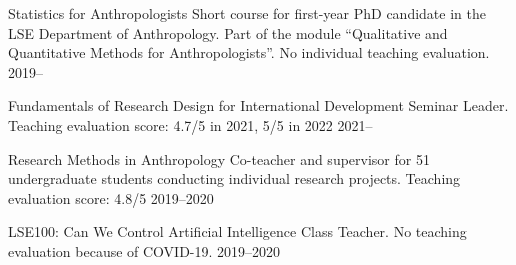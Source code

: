 



\begin{cvexperiences}

\nopagebreak
  \cvexperience
    {Statistics for Anthropologists} %
    {Short course for first-year PhD candidate in the LSE Department of Anthropology. Part of the module ``Qualitative and Quantitative Methods for Anthropologists''. No individual teaching evaluation.} %
    {2019--} %

\end{cvexperiences}


\begin{cvexperiences}
  \cvexperience
    {Fundamentals of Research Design for International Development} %
    {Seminar Leader. Teaching evaluation score: 4.7/5 in 2021, 5/5 in 2022} %
    {2021--} %

  \cvexperience
    {Research Methods in Anthropology} %
    {Co-teacher and supervisor for 51 undergraduate students conducting individual research projects. Teaching evaluation score: 4.8/5} %
    {2019--2020} %

  \cvexperience
    {LSE100: Can We Control Artificial Intelligence} %
    {Class Teacher. No teaching evaluation because of COVID-19.} %
    {2019--2020} %

\end{cvexperiences}

